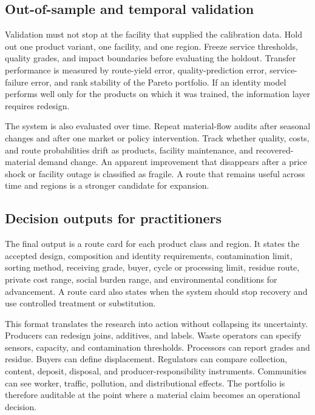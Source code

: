 \documentclass[conference]{IEEEtran}
\begin{document}
\subsection{Out-of-sample and temporal validation}

Validation must not stop at the facility that supplied the calibration data. Hold out one product variant, one facility, and one region. Freeze service thresholds, quality grades, and impact boundaries before evaluating the holdout. Transfer performance is measured by route-yield error, quality-prediction error, service-failure error, and rank stability of the Pareto portfolio. If an identity model performs well only for the products on which it was trained, the information layer requires redesign.

The system is also evaluated over time. Repeat material-flow audits after seasonal changes and after one market or policy intervention. Track whether quality, costs, and route probabilities drift as products, facility maintenance, and recovered-material demand change. An apparent improvement that disappears after a price shock or facility outage is classified as fragile. A route that remains useful across time and regions is a stronger candidate for expansion.

\subsection{Decision outputs for practitioners}

The final output is a route card for each product class and region. It states the accepted design, composition and identity requirements, contamination limit, sorting method, receiving grade, buyer, cycle or processing limit, residue route, private cost range, social burden range, and environmental conditions for advancement. A route card also states when the system should stop recovery and use controlled treatment or substitution.

This format translates the research into action without collapsing its uncertainty. Producers can redesign joins, additives, and labels. Waste operators can specify sensors, capacity, and contamination thresholds. Processors can report grades and residue. Buyers can define displacement. Regulators can compare collection, content, deposit, disposal, and producer-responsibility instruments. Communities can see worker, traffic, pollution, and distributional effects. The portfolio is therefore auditable at the point where a material claim becomes an operational decision.
\end{document}
